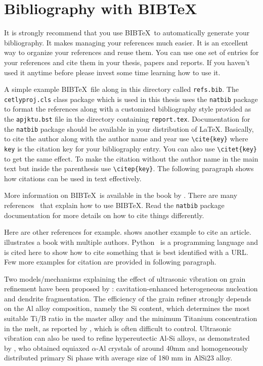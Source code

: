 \documentclass[BTech]{cetlyproj}
\begin{document}
\section{Bibliography with BIB\TeX}

It is strongly recommend that you use BIB\TeX\ to automatically generate
your bibliography.  It makes managing your references much easier.  It
is an excellent way to organize your references and reuse them.  You
can use one set of entries for your references and cite them in your
thesis, papers and reports.  If you haven't used it anytime before
please invest some time learning how to use it.  

A simple example BIB\TeX\ file along in this directory called \verb+refs.bib+. The \verb+cetlyproj.cls+ class package which
is used in this thesis uses the \verb+natbib+ package to format the references along with a customized bibliography style provided as the \verb+apjktu.bst+ file in the directory containing \verb+report.tex+.  Documentation for the \verb+natbib+ package should be available in your distribution of \LaTeX.  Basically, to cite the author along with the author name and year use \verb+\cite{key}+ where \verb+key+ is the citation key for your bibliography entry.  You can also use \verb+\citet{key}+ to get the same effect.  To make the citation without the author name in the main text but inside the parenthesis use \verb+\citep{key}+.  The following paragraph shows how citations can be used in text effectively.

More information on BIB\TeX\ is available in the book by
\cite{lamport:86}.  There are many references~\citep{lamport:86,latexcompanion} that explain how to use
BIB\TeX.  Read the \verb+natbib+ package documentation for more
details on how to cite things differently.

Here are other references for example.\citet{einstein:905} shows another example to cite an article.\citet{latexcompanion} illustrates a book with multiple authors.  Python~\citep{py:python} is a programming language and is
cited here to show how to cite something that is best identified with a URL. Few more examples for citation are provided in following paragraph.

Two models/mechanisms explaining the effect of ultrasonic vibration on grain refinement have been proposed by \cite{eskin:1998}: cavitation-enhanced heterogeneous nucleation and dendrite fragmentation. The efficiency of the grain refiner strongly depends on the Al alloy composition, namely the Si content, which determines the most suitable Ti/B ratio in the master alloy and the minimum Titanium concentration in the melt, as reported by \cite{sritharan:1997}, which is often difficult to control. Ultrasonic vibration can also be used to refine hypereutectic Al-Si alloys, as demonstrated by \cite{feng:2008}, who obtained equiaxed $\alpha$-Al crystals of around 40mm and homogeneously distributed primary Si phase with average size of 180 mm in AlSi23 alloy.
\end{document}

